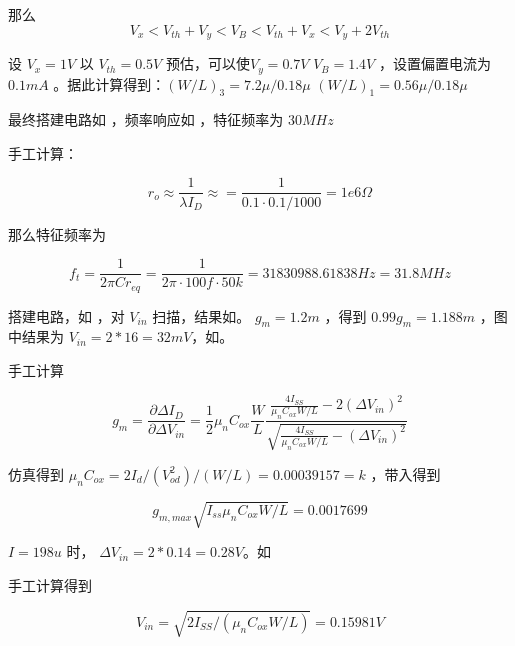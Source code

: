 \documentclass[lang=cn,11pt,a4paper,cite=authoryear]{elegantpaper}
\begin{document}
那么 \[V_x < V_{th} + V_y < V_B < V_{th} + V_x < V_y + 2 V_{th}\]



设 \(V_x = 1 V\) 以 \(V_{th} = 0.5 V\) 预估，可以使\(V_y  =0.7 V\) \(V_B = 1.4 V\) ，设置偏置电流为 \(0.1 mA\) 。据此计算得到：\((W/L)_3 = 7.2\mu / 0.18 \mu\) \((W/L)_1 = 0.56 
\mu/0.18\mu \)

最终搭建电路如  ，频率响应如 ，特征频率为 \(30 M Hz\)





手工计算：

\[r_o \approx \frac{1}{\lambda I_D} \approx = \frac{1}{0.1 \cdot 0.1 / 1000} = 1e6 \Omega\]

那么特征频率为

\[f_t = \frac{1}{2 \pi C r_{eq}} = \frac{1}{2 \pi \cdot 100 f \cdot 50 k} = 31830988.61838 Hz = 31.8 MHz\] 



搭建电路，如 ，对 \(V_{in}\) 扫描，结果如。 \(g_m = 1.2 m\) ，得到 \(0.99 g_m = 1.188 m\) ，图中结果为 \(V_{in} = 2 *16 = 32 mV\)，如。


手工计算 

\[g_m=\frac{\partial \Delta I_{D}}{\partial \Delta V_{i n}}=\frac{1}{2} \mu_{n} C_{o x} \frac{W}{L} \frac{\frac{4 I_{S S}}{\mu_{n} C_{o x} W / L}-2\left(\Delta V_{i n}\right)^{2}}{\sqrt{\frac{4 I_{S S}}{\mu_{n} C_{o x} W / L}-\left(\Delta V_{i n}\right)^{2}}}\]

仿真得到 \(\mu_n C_{ox} = 2 I_d / (V_{od}^2) / (W/L) = 0.00039157 = k\) ，带入得到

\[g_{m,max} \sqrt{I_{ss} \mu_nC_{ox} W/L}  = 0.0017699\]



\(I = 198 u\) 时， \(\Delta V_{in} = 2 * 0.14 = 0.28 V\)。如

手工计算得到

\[V_{in} =\sqrt{2 I_{S S} /\left(\mu_{n} C_{o x} W / L\right)} = 0.15981 V\] 
\end{document}
